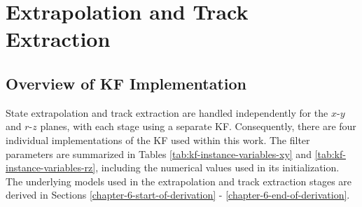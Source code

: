 \newpage
\section{Extrapolation and Track Extraction}
\label{chapter-6-extrapolation-track-extraction}

\subsection{Overview of KF Implementation}
\label{chapter-6-overview-of-kf}

State extrapolation and track extraction are handled independently for the $x$-$y$ and $r$-$z$ planes, with each stage using a separate KF. Consequently, there are four individual implementations of the KF used within this work. The filter parameters are summarized in Tables \ref{tab:kf-instance-variables-xy} and \ref{tab:kf-instance-variables-rz}, including the numerical values used in its initialization. The underlying models used in the extrapolation and track extraction stages are derived in Sections \ref{chapter-6-start-of-derivation} - \ref{chapter-6-end-of-derivation}.



